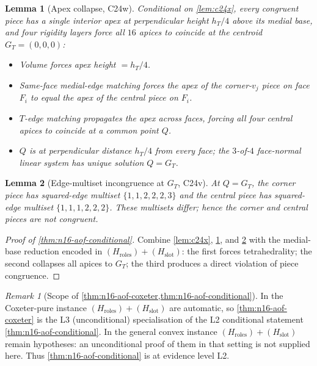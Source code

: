 \documentclass[11pt,a4paper]{article}
\theoremstyle{plain}
\newtheorem{lemma}[lemma]{Lemma}
\theoremstyle{definition}
\theoremstyle{remark}
\newtheorem{remark}[remark]{Remark}
\newcommand{\Hroles}{H_{\mathrm{roles}}}
\newcommand{\Hslot}{H_{\mathrm{slot}}}
\begin{document}
\begin{lemma}[Apex collapse, C24w]\label{lem:c24w}
Conditional on \cref{lem:c24x}, every congruent piece has a single interior
apex at perpendicular height $h_{T}/4$ above its medial base, and four
rigidity layers force all $16$ apices to coincide at the centroid
$G_{T} = (0, 0, 0)$:
\begin{itemize}
  \item[$(L_{1})$] Volume forces apex height $= h_{T}/4$.
  \item[$(L_{2})$] Same-face medial-edge matching forces the apex of the
        corner-$v_{j}$ piece on face $F_{i}$ to equal the apex of the
        central piece on $F_{i}$.
  \item[$(L_{3})$] $T$-edge matching propagates the apex across faces,
        forcing all four central apices to coincide at a common point $Q$.
  \item[$(L_{4})$] $Q$ is at perpendicular distance $h_{T}/4$ from every
        face; the $3$-of-$4$ face-normal linear system has unique solution
        $Q = G_{T}$.
\end{itemize}
\end{lemma}

\begin{lemma}[Edge-multiset incongruence at $G_{T}$, C24v]\label{lem:c24v}
At $Q = G_{T}$, the corner piece has squared-edge multiset
$\{1, 1, 2, 2, 2, 3\}$ and the central piece has squared-edge multiset
$\{1, 1, 1, 2, 2, 2\}$.  These multisets differ; hence the corner and
central pieces are not congruent.
\end{lemma}

\begin{proof}[Proof of \cref{thm:n16-aof-conditional}]
Combine \cref{lem:c24x}, \cref{lem:c24w}, and \cref{lem:c24v} with the
medial-base reduction encoded in $(\Hroles) + (\Hslot)$: the first forces
tetrahedrality; the second collapses all apices to $G_{T}$; the third
produces a direct violation of piece congruence.
\end{proof}

\begin{remark}[Scope of \cref{thm:n16-aof-coxeter,thm:n16-aof-conditional}]
In the Coxeter-pure instance $(\Hroles) + (\Hslot)$ are automatic,
so \cref{thm:n16-aof-coxeter} is the \textsf{L3} (unconditional)
specialisation of the \textsf{L2} conditional statement
\cref{thm:n16-aof-conditional}.  In the
general convex instance $(\Hroles) + (\Hslot)$ remain hypotheses: an
unconditional proof of them in that setting is not supplied here.  Thus
\cref{thm:n16-aof-conditional} is at evidence level \textsf{L2}.
\end{remark}
\end{document}
